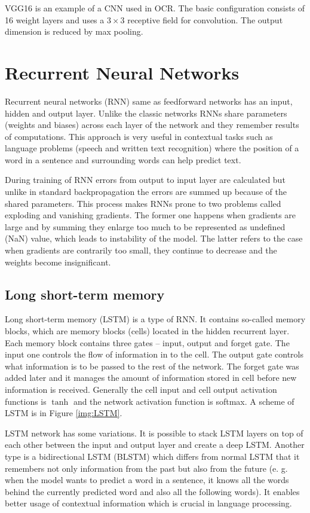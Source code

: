 VGG16 is an example of a CNN used in OCR. The basic configuration consists of 16 weight layers and uses a $3 \times 3$ receptive field for convolution. The output dimension is reduced by max pooling.\cite{ulhassan2021}

\section{Recurrent Neural Networks}
\label{sec:RNN}

Recurrent neural networks (RNN) same as feedforward networks has an input, hidden and output layer. Unlike the classic networks RNNs share parameters (weights and biases) across each layer of the network and they remember results of computations. This approach is very useful in contextual tasks such as language problems (speech and written text recognition) where the position of a word in a sentence and surrounding words can help predict text.

During training of RNN errors from output to input layer are calculated but unlike in standard backpropagation the errors are summed up because of the shared parameters. This process makes RNNs prone to two problems called exploding and vanishing gradients. The former one happens when gradients are large and by summing they enlarge too much to be represented as undefined (NaN) value, which leads to instability of the model. The latter refers to the case when gradients are contrarily too small, they continue to decrease and the weights become insignificant.\cite{rnn}

\subsection*{Long short-term memory}
\label{sec:LSTM}

Long short-term memory (LSTM) is a type of RNN. It contains so-called memory blocks, which are memory blocks (cells) located in the hidden recurrent layer. Each memory block contains three gates -- input, output and forget gate. The input one controls the flow of information in to the cell. The output gate controls what information is to be passed to the rest of the network. The forget gate was added later and it manages the amount of information stored in cell before new information is received. Generally the cell input and cell output activation functions is $\tanh$ and the network activation function is softmax. A scheme of LSTM is in Figure \ref*{img:LSTM}.\cite{lstm}

LSTM network has some variations. It is possible to stack LSTM layers on top of each other between the input and output layer and create a deep LSTM. Another type is a bidirectional LSTM (BLSTM) which differs from normal LSTM that it remembers not only information from the past but also from the future (e. g. when the model wants to predict a word in a sentence, it knows all the words behind the currently predicted word and also all the following words). It enables better usage of contextual information which is crucial in language processing.\cite{lstm,baueldungLSTM}

